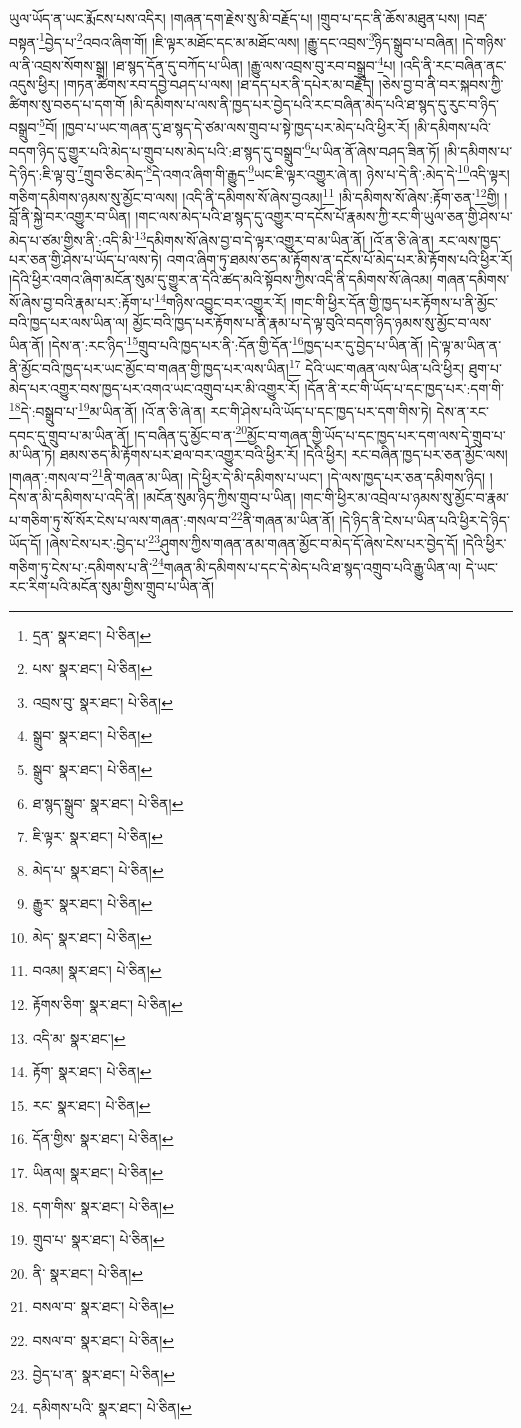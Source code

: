 ཡུལ་ཡོད་ན་ཡང་རྨོངས་པས་འདིར། །གཞན་དག་རྗེས་སུ་མི་བརྗོད་པ། །གྲུབ་པ་དང་ནི་ཆོས་མཐུན་པས། །བརྡ་བསྟན་\footnote{དྲན་  སྣར་ཐང་།  པེ་ཅིན། }བྱེད་པ་\footnote{པས་  སྣར་ཐང་།  པེ་ཅིན། }འབའ་ཞིག་གོ། །ཇི་ལྟར་མཐོང་དང་མ་མཐོང་ལས། །རྒྱུ་དང་འབྲས་\footnote{འབྲས་བུ་  སྣར་ཐང་།  པེ་ཅིན། }ཉིད་སྒྲུབ་པ་བཞིན། །དེ་གཉིས་ལ་ནི་འབྲས་སོགས་སྒྲ། །ཐ་སྙད་དོན་དུ་བཀོད་པ་ཡིན། །རྒྱུ་ལས་འབྲས་བུ་རབ་བསྒྲུབ་\footnote{སྒྲུབ་  སྣར་ཐང་།  པེ་ཅིན། }པ། །འདི་ནི་རང་བཞིན་ནང་འདུས་ཕྱིར། །གཏན་ཚིགས་རབ་དབྱེ་བཤད་པ་ལས། །ཐ་དད་པར་ནི་དཔེར་མ་བརྗོད། །ཅེས་བྱ་བ་ནི་བར་སྐབས་ཀྱི་ཚིགས་སུ་བཅད་པ་དག་གོ །མི་དམིགས་པ་ལས་ནི་ཁྱད་པར་བྱེད་པའི་རང་བཞིན་མེད་པའི་ཐ་སྙད་དུ་རུང་བ་ཉིད་བསྒྲུབ་\footnote{སྒྲུབ་  སྣར་ཐང་།  པེ་ཅིན། }བོ། །ཁྱབ་པ་ཡང་གཞན་དུ་ཐ་སྙད་དེ་ཙམ་ལས་གྲུབ་པ་སྟེ་ཁྱད་པར་མེད་པའི་ཕྱིར་རོ། །མི་དམིགས་པའི་བདག་ཉིད་དུ་གྱུར་པའི་མེད་པ་གྲུབ་པས་མེད་པའི་:ཐ་སྙད་དུ་བསྒྲུབ་\footnote{ཐ་སྙད་སྒྲུབ་  སྣར་ཐང་།  པེ་ཅིན། }པ་ཡིན་ནོ་ཞེས་བཤད་ཟིན་ཏོ། །མི་དམིགས་པ་དེ་ཉིད་:ཇི་ལྟ་བུ་\footnote{ཇི་ལྟར་  སྣར་ཐང་།  པེ་ཅིན། }གྲུབ་ཅིང་མེད་\footnote{མེད་པ་  སྣར་ཐང་།  པེ་ཅིན། }དེ་འགའ་ཞིག་གི་རྒྱུད་\footnote{རྒྱུར་  སྣར་ཐང་།  པེ་ཅིན། }ཡང་ཇི་ལྟར་འགྱུར་ཞེ་ན། ཉེས་པ་དེ་ནི་:མེད་དེ་\footnote{མེད་  སྣར་ཐང་།  པེ་ཅིན། }འདི་ལྟར། གཅིག་དམིགས་ཉམས་སུ་མྱོང་བ་ལས། །འདི་ནི་དམིགས་སོ་ཞེས་བྱའམ།\footnote{བའམ།  སྣར་ཐང་།  པེ་ཅིན། } །མི་དམིགས་སོ་ཞེས་:རྟོག་ཅན་\footnote{རྟོགས་ཅིག་  སྣར་ཐང་།  པེ་ཅིན། }གྱི། །བློ་ནི་སྐྱེ་བར་འགྱུར་བ་ཡིན། །གང་ལས་མེད་པའི་ཐ་སྙད་དུ་འགྱུར་བ་དངོས་པོ་རྣམས་ཀྱི་རང་གི་ཡུལ་ཅན་གྱི་ཤེས་པ་མེད་པ་ཙམ་གྱིས་ནི་:འདི་མི་\footnote{འདི་མ་  སྣར་ཐང་། }དམིགས་སོ་ཞེས་བྱ་བ་དེ་ལྟར་འགྱུར་བ་མ་ཡིན་ནོ། །འོ་ན་ཅི་ཞེ་ན། རང་ལས་ཁྱད་པར་ཅན་གྱི་ཤེས་པ་ཡོད་པ་ལས་ཏེ། འགའ་ཞིག་ཏུ་ཐམས་ཅད་མ་རྟོགས་ན་དངོས་པོ་མེད་པར་མི་རྟོགས་པའི་ཕྱིར་རོ། །དེའི་ཕྱིར་འགའ་ཞིག་མངོན་སུམ་དུ་གྱུར་ན་དེའི་ཚད་མའི་སྟོབས་ཀྱིས་འདི་ནི་དམིགས་སོ་ཞེའམ། གཞན་དམིགས་སོ་ཞེས་བྱ་བའི་རྣམ་པར་:རྟོག་པ་\footnote{རྟོག་  སྣར་ཐང་།  པེ་ཅིན། }གཉིས་འབྱུང་བར་འགྱུར་རོ། །གང་གི་ཕྱིར་དོན་གྱི་ཁྱད་པར་རྟོགས་པ་ནི་མྱོང་བའི་ཁྱད་པར་ལས་ཡིན་ལ། མྱོང་བའི་ཁྱད་པར་རྟོགས་པ་ནི་རྣམ་པ་དེ་ལྟ་བུའི་བདག་ཉིད་ཉམས་སུ་མྱོང་བ་ལས་ཡིན་ནོ། །དེས་ན་:རང་ཉིད་\footnote{རང་  སྣར་ཐང་།  པེ་ཅིན། }གྲུབ་པའི་ཁྱད་པར་ནི་:དོན་གྱི་དོན་\footnote{དོན་གྱིས་  སྣར་ཐང་།  པེ་ཅིན། }ཁྱད་པར་དུ་བྱེད་པ་ཡིན་ནོ། །དེ་ལྟ་མ་ཡིན་ན་ནི་མྱོང་བའི་ཁྱད་པར་ཡང་མྱོང་བ་གཞན་གྱི་ཁྱད་པར་ལས་ཡིན།\footnote{ཡིནལ།  སྣར་ཐང་།  པེ་ཅིན། } དེའི་ཡང་གཞན་ལས་ཡིན་པའི་ཕྱིར། ཐུག་པ་མེད་པར་འགྱུར་བས་ཁྱད་པར་འགའ་ཡང་འགྲུབ་པར་མི་འགྱུར་རོ། །དོན་ནི་རང་གི་ཡོད་པ་དང་ཁྱད་པར་:དག་གི་\footnote{དག་གིས་  སྣར་ཐང་།  པེ་ཅིན། }དེ་:བསྒྲུབ་པ་\footnote{གྲུབ་པ་  སྣར་ཐང་།  པེ་ཅིན། }མ་ཡིན་ནོ། །འོ་ན་ཅི་ཞེ་ན། རང་གི་ཤེས་པའི་ཡོད་པ་དང་ཁྱད་པར་དག་གིས་ཏེ། དེས་ན་རང་དབང་དུ་གྲུབ་པ་མ་ཡིན་ནོ། །ད་བཞིན་དུ་མྱོང་བ་ན་\footnote{ནི་  སྣར་ཐང་།  པེ་ཅིན། }མྱོང་བ་གཞན་གྱི་ཡོད་པ་དང་ཁྱད་པར་དག་ལས་དེ་གྲུབ་པ་མ་ཡིན་ཏེ། ཐམས་ཅད་མི་རྟོགས་པར་ཐལ་བར་འགྱུར་བའི་ཕྱིར་རོ། །དེའི་ཕྱིར། རང་བཞིན་ཁྱད་པར་ཅན་མྱོང་ལས། །གཞན་:གསལ་བ་\footnote{བསལ་བ་  སྣར་ཐང་།  པེ་ཅིན། }ནི་གཞན་མ་ཡིན། །དེ་ཕྱིར་དེ་མི་དམིགས་པ་ཡང་། །དེ་ལས་ཁྱད་པར་ཅན་དམིགས་ཉིད། །དེས་ན་མི་དམིགས་པ་འདི་ནི། །མངོན་སུམ་ཉིད་ཀྱིས་གྲུབ་པ་ཡིན། །གང་གི་ཕྱིར་མ་འབྲེལ་པ་ཉམས་སུ་མྱོང་བ་རྣམ་པ་གཅིག་ཏུ་སོ་སོར་ངེས་པ་ལས་གཞན་:གསལ་བ་\footnote{བསལ་བ་  སྣར་ཐང་།  པེ་ཅིན། }ནི་གཞན་མ་ཡིན་ནོ། །དེ་ཉིད་ནི་ངེས་པ་ཡིན་པའི་ཕྱིར་དེ་ཉིད་ཡོད་དོ། །ཞེས་ངེས་པར་:བྱེད་པ་\footnote{བྱེད་པ་ན་  སྣར་ཐང་།  པེ་ཅིན། }ཤུགས་ཀྱིས་གཞན་ནམ་གཞན་མྱོང་བ་མེད་དོ་ཞེས་ངེས་པར་བྱེད་དོ། །དེའི་ཕྱིར་གཅིག་ཏུ་ངེས་པ་:དམིགས་པ་ནི་\footnote{དམིགས་པའི་  སྣར་ཐང་།  པེ་ཅིན། }གཞན་མི་དམིགས་པ་དང་དེ་མེད་པའི་ཐ་སྙད་འགྲུབ་པའི་རྒྱུ་ཡིན་ལ། དེ་ཡང་རང་རིག་པའི་མངོན་སུམ་གྱིས་གྲུབ་པ་ཡིན་ནོ། 
